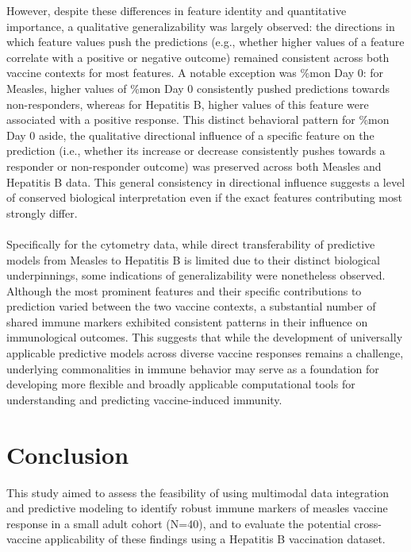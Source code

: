 \documentclass[12pt,a4paper]{report}
\begin{document}
\noindent
However, despite these differences in feature identity and quantitative importance, a qualitative generalizability was largely observed: the directions in which feature values push the predictions (e.g., whether higher values of a feature correlate with a positive or negative outcome) remained consistent across both vaccine contexts for most features. A notable exception was \%\acrshort{mon} Day 0: for Measles, higher values of \%\acrshort{mon} Day 0 consistently pushed predictions towards non-responders, whereas for Hepatitis B, higher values of this feature were associated with a positive response. This distinct behavioral pattern for \%\acrshort{mon} Day 0 aside, the qualitative directional influence of a specific feature on the prediction (i.e., whether its increase or decrease consistently pushes towards a responder or non-responder outcome) was preserved across both Measles and Hepatitis B data. This general consistency in directional influence suggests a level of conserved biological interpretation even if the exact features contributing most strongly differ.\\
\\
Specifically for the cytometry data, while direct transferability of predictive models from Measles to Hepatitis B is limited due to their distinct biological underpinnings, some indications of generalizability were nonetheless observed. Although the most prominent features and their specific contributions to prediction varied between the two vaccine contexts, a substantial number of shared immune markers exhibited consistent patterns in their influence on immunological outcomes. This suggests that while the development of universally applicable predictive models across diverse vaccine responses remains a challenge, underlying commonalities in immune behavior may serve as a foundation for developing more flexible and broadly applicable computational tools for understanding and predicting vaccine-induced immunity.


\chapter{Conclusion}
\noindent
This study aimed to assess the feasibility of using multimodal data integration and predictive modeling to identify robust immune markers of measles vaccine response in a small adult cohort (N=40), and to evaluate the potential cross-vaccine applicability of these findings using a Hepatitis B vaccination dataset.
\end{document}
